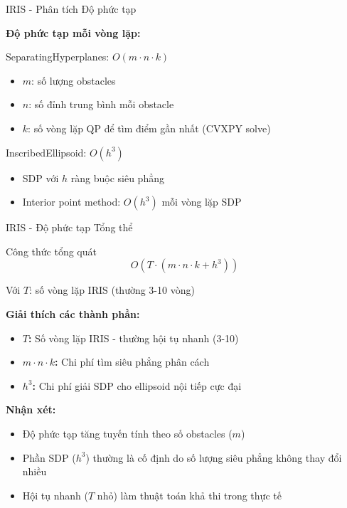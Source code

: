 \documentclass[aspectratio=169]{beamer}
\begin{document}
\begin{frame}{IRIS - Phân tích Độ phức tạp}

    \textbf{Độ phức tạp mỗi vòng lặp:}
    
    \vspace{0.5em}
    \begin{block}{SeparatingHyperplanes: $O(m \cdot n \cdot k)$}
        \small
        \begin{itemize}
            \item $m$: số lượng obstacles
            \item $n$: số đỉnh trung bình mỗi obstacle
            \item $k$: số vòng lặp QP để tìm điểm gần nhất (CVXPY solve)
        \end{itemize}
    \end{block}

    \vspace{0.3em}
    \begin{block}{InscribedEllipsoid: $O(h^3)$}
        \small
        \begin{itemize}
            \item SDP với $h$ ràng buộc siêu phẳng
            \item Interior point method: $O(h^3)$ mỗi vòng lặp SDP
        \end{itemize}
    \end{block}

\end{frame}

\begin{frame}{IRIS - Độ phức tạp Tổng thể}

    \begin{block}{Công thức tổng quát}
        \[
            O(T \cdot (m \cdot n \cdot k + h^3))
        \]
        
        \small
        Với $T$: số vòng lặp IRIS (thường 3-10 vòng)
    \end{block}

    \vspace{1em}
    \textbf{Giải thích các thành phần:}
    \begin{itemize}
        \item \textbf{$T$:} Số vòng lặp IRIS - thường hội tụ nhanh (3-10)
        \item \textbf{$m \cdot n \cdot k$:} Chi phí tìm siêu phẳng phân cách
        \item \textbf{$h^3$:} Chi phí giải SDP cho ellipsoid nội tiếp cực đại
    \end{itemize}

    \vspace{0.5em}
    \textbf{Nhận xét:}
    \begin{itemize}
        \item Độ phức tạp tăng tuyến tính theo số obstacles ($m$)
        \item Phần SDP ($h^3$) thường là cố định do số lượng siêu phẳng không thay đổi nhiều
        \item Hội tụ nhanh ($T$ nhỏ) làm thuật toán khả thi trong thực tế
    \end{itemize}

\end{frame}
\end{document}
